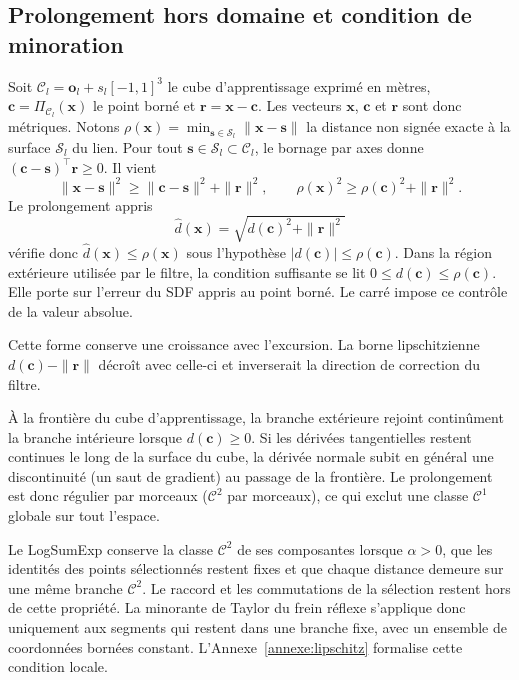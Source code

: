 \subsection*{Prolongement hors domaine et condition de minoration} Soit $\mathcal{C}_l=\mathbf{o}_l+s_l[-1,1]^3$ le cube d'apprentissage exprimé en mètres, $\mathbf{c}=\Pi_{\mathcal{C}_l}(\mathbf{x})$ le point borné et $\boldsymbol{r}=\mathbf{x}-\mathbf{c}$. Les vecteurs $\mathbf{x}$, $\mathbf{c}$ et $\boldsymbol{r}$ sont donc métriques. Notons $\rho(\mathbf{x})=\min_{\mathbf{s}\in\mathcal{S}_l}\|\mathbf{x}-\mathbf{s}\|$ la distance non signée exacte à la surface $\mathcal{S}_l$ du lien. Pour tout $\mathbf{s}\in\mathcal{S}_l\subset\mathcal{C}_l$, le bornage par axes donne $(\mathbf{c}-\mathbf{s})^{\top}\boldsymbol{r}\geq0$. Il vient
\begin{equation}
\|\mathbf{x}-\mathbf{s}\|^2
\geq \|\mathbf{c}-\mathbf{s}\|^2+\|\boldsymbol{r}\|^2,
\qquad
\rho(\mathbf{x})^2\geq\rho(\mathbf{c})^2+\|\boldsymbol{r}\|^2.
\end{equation}
Le prolongement appris
\begin{equation}
\hat d(\mathbf{x})=\sqrt{d(\mathbf{c})^2+\|\boldsymbol{r}\|^2}
\end{equation}
vérifie donc $\hat d(\mathbf{x})\leq\rho(\mathbf{x})$ sous l'hypothèse $|d(\mathbf{c})|\leq\rho(\mathbf{c})$. Dans la région extérieure utilisée par le filtre, la condition suffisante se lit $0\leq d(\mathbf{c})\leq\rho(\mathbf{c})$. Elle porte sur l'erreur du \ac{SDF} appris au point borné. Le carré impose ce contrôle de la valeur absolue.

Cette forme conserve une croissance avec l'excursion. La borne lipschitzienne $d(\mathbf{c})-\|\boldsymbol{r}\|$ décroît avec celle-ci et inverserait la direction de correction du filtre.

À la frontière du cube d'apprentissage, la branche extérieure rejoint continûment la branche intérieure lorsque $d(\mathbf{c})\geq0$. Si les dérivées tangentielles restent continues le long de la surface du cube, la dérivée normale subit en général une discontinuité (un saut de gradient) au passage de la frontière. Le prolongement est donc régulier par morceaux ($\mathcal C^2$ par morceaux), ce qui exclut une classe $\mathcal C^1$ globale sur tout l'espace.

Le LogSumExp conserve la classe $\mathcal C^2$ de ses composantes lorsque $\alpha>0$, que les identités des points sélectionnés restent fixes et que chaque distance demeure sur une même branche $\mathcal C^2$. Le raccord et les commutations de la sélection restent hors de cette propriété. La minorante de Taylor du frein réflexe s'applique donc uniquement aux segments qui restent dans une branche fixe, avec un ensemble de coordonnées bornées constant. L'Annexe~\ref{annexe:lipschitz} formalise cette condition locale.

